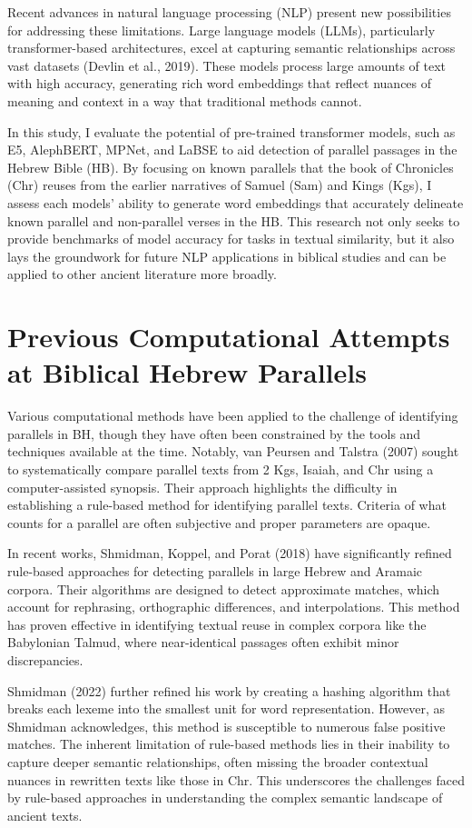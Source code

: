 \documentclass[12pt]{article}
\begin{document}
Recent advances in natural language processing (NLP) present new possibilities for addressing these limitations. Large language models (LLMs), particularly transformer-based architectures, excel at capturing semantic relationships across vast datasets (Devlin et al., 2019). These models process large amounts of text with high accuracy, generating rich word embeddings that reflect nuances of meaning and context in a way that traditional methods cannot.

In this study, I evaluate the potential of pre-trained transformer models, such as E5, AlephBERT, MPNet, and LaBSE to aid detection of parallel passages in the Hebrew Bible (HB). By focusing on known parallels that the book of Chronicles (Chr) reuses from the earlier narratives of Samuel (Sam) and Kings (Kgs), I assess each models’ ability to generate word embeddings that accurately delineate known parallel and non-parallel verses in the HB. This research not only seeks to provide benchmarks of model accuracy for tasks in textual similarity, but it also lays the groundwork for future NLP applications in biblical studies and can be applied to other ancient literature more broadly.

\section{Previous Computational Attempts at Biblical Hebrew Parallels}
Various computational methods have been applied to the challenge of identifying parallels in BH, though they have often been constrained by the tools and techniques available at the time. Notably, van Peursen and Talstra (2007) sought to systematically compare parallel texts from 2 Kgs, Isaiah, and Chr using a computer-assisted synopsis. Their approach highlights the difficulty in establishing a rule-based method for identifying parallel texts. Criteria of what counts for a parallel are often subjective and proper parameters are opaque.

In recent works, Shmidman, Koppel, and Porat (2018) have significantly refined rule-based approaches for detecting parallels in large Hebrew and Aramaic corpora. Their algorithms are designed to detect approximate matches, which account for rephrasing, orthographic differences, and interpolations. This method has proven effective in identifying textual reuse in complex corpora like the Babylonian Talmud, where near-identical passages often exhibit minor discrepancies.

Shmidman (2022) further refined his work by creating a hashing algorithm that breaks each lexeme into the smallest unit for word representation. However, as Shmidman acknowledges, this method is susceptible to numerous false positive matches. The inherent limitation of rule-based methods lies in their inability to capture deeper semantic relationships, often missing the broader contextual nuances in rewritten texts like those in Chr. This underscores the challenges faced by rule-based approaches in understanding the complex semantic landscape of ancient texts.
\end{document}
